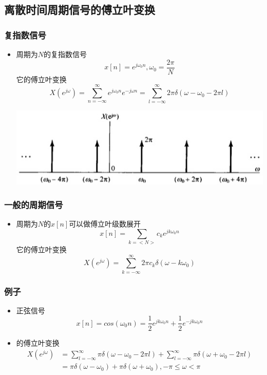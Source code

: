 \documentclass[CJKutf8,xcolor=pdftex,dvipsnames,table]{beamer}
\begin{document}
\begin{CJK*}{UTF8}{song}
  \section{离散时间周期信号的傅立叶变换}

  \begin{frame}
    \frametitle{复指数信号}
    \begin{itemize}
    \item 周期为$N$的复指数信号
    \[
    	x[n]=e^{j\omega_0 n}, \omega_0=\frac{2\pi}{N}
    \]
    它的傅立叶变换
    \[
    	X(e^{j\omega})=\sum_{n=-\infty}^{\infty}e^{j\omega_0 n}e^{-j\omega n}=\sum_{l=-\infty}^{\infty}2\pi \delta(\omega - \omega_0 - 2\pi l)
    \]
    	\begin{center}
    	\includegraphics[scale=.4]{ss-c-f5-8}
    	\end{center}  

    \end{itemize}
  \end{frame}     
  
  \begin{frame}
    \frametitle{一般的周期信号}
    \begin{itemize}
    \item 周期为$N$的$x[n]$可以做傅立叶级数展开
    \[
    	x[n] = \sum_{k=<N>} c_k e^{jk\omega_0 n}
    \]
    它的傅立叶变换
    \[
    	X(e^{j\omega})=\sum_{k=-\infty}^{\infty}2\pi c_k \delta(\omega - k\omega_0)
    \]
    \end{itemize}

  \end{frame}   
  
  \begin{frame}
    \frametitle{例子}
    \begin{itemize}
    \item 正弦信号
    \[
    	x[n]=cos(\omega_0 n)=\frac{1}{2}e^{jk\omega_0 n}+\frac{1}{2}e^{-jk\omega_0 n}
	\]
	\item 的傅立叶变换
        \begin{align*}
 		X(e^{j\omega}) & = \sum_{l=-\infty}^{\infty}\pi \delta(\omega - \omega_0 - 2\pi l)+\sum_{l=-\infty}^{\infty}\pi \delta(\omega + \omega_0 - 2\pi l) \\
		& = \pi \delta(\omega - \omega_0)+\pi \delta(\omega + \omega_0), -\pi \leq \omega < \pi   
    	\end{align*} 	
	

\end{itemize}
\end{frame}
\end{CJK*}
\end{document}
